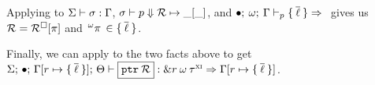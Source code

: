 \begin{preservation}
{    Applying  to
    $\Sigma \vdash \sigma : \Gamma$,
    $ \sigma \vdash p \Downarrow \mathcal{R} \mapsto \_ [\_] $, and
    $\oxmusafety{\oxemptyctx}{\oxvarctx}{\oxmuta}{\oxplaceexpr}{
      \oxset{\overline{\oxloan}}
    }$ gives us $\mathcal{R} = \mathcal{R}^\square[\pi]$ and
    $\,^{\omega}\pi\, \in \{ \: \overline{\ell} \: \}$.

    Finally, we can apply  to the two facts above to get
    $\oxtypjudge{\oxglobalctx}{\oxemptyctx}{\oxkontctx}{
      \oxupdate{\oxvarctx}{
        \oxloanctxentry{\oxcprov}{
          \oxset{\overline{\oxloan}}
        }
      }
    }{
      \oxptr{\oxreferent}
    }{\oxtref{\oxcprov}{\oxmuta}{\oxxitype}}{
      \oxupdate{\oxvarctx}{
        \oxloanctxentry{\oxcprov}{
          \oxset{\overline{\oxloan}}
        }
      }
    }$.
  }


\end{preservation}




